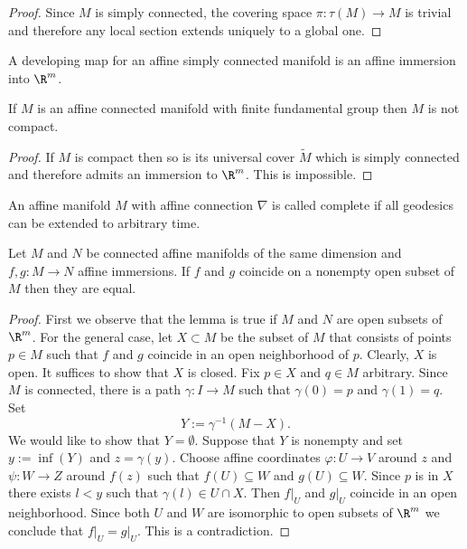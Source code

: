 \begin{proof}
	Since $M$ is simply connected, the covering space $\pi: \tau(M) \rightarrow M$ is trivial and therefore any local section extends uniquely to a global one.
\end{proof}

\begin{definition} 
	A developing map for an affine simply connected manifold is an affine immersion into $\R^m$.
\end{definition}

\begin{corollary}
	If $M$ is an affine connected manifold with finite fundamental group then $M$ is not compact.
\end{corollary}

\begin{proof}
	If $M$ is compact then so is its universal cover $\tilde{M}$ which is simply connected and therefore admits an immersion to $\R^m$. This is impossible.
\end{proof}

\begin{definition} 
	An affine manifold $M$ with affine connection $\nabla$ is called complete if all geodesics can be extended to arbitrary time.
\end{definition}

\begin{lemma}\label{unique}
	Let $M$ and $N$ be connected affine manifolds of the same dimension and $f,g:M \rightarrow N$ affine immersions. If $f$ and $g$ coincide on a nonempty open subset of $M$ then they are equal.
\end{lemma}
\begin{proof}
	First we observe that the lemma is true if $M$ and $N$ are open subsets of $\R^m$.
	For the general case, let $X\subset M$ be the subset of $M$ that consists of points $p\in M$ such that $f$ and $g$ coincide in an open neighborhood of $p$. Clearly, $X$ is open. It suffices to show that $X$ is closed.
	Fix $p \in X$ and $q \in M$ arbitrary. Since $M$ is connected, there is a path $\gamma: I \rightarrow M$ such that
	$\gamma(0)=p$ and $\gamma(1)=q$. Set \[Y:= \gamma^{-1}(M-X).\] We would like to show that $Y=\emptyset$. Suppose that $Y$ is nonempty and set $y:=\inf(Y)$ and $z=\gamma(y)$. Choose affine coordinates $\varphi: U \rightarrow V$ around $z$ and $ \psi: W \rightarrow Z $ around $f(z)$ such that $f(U) \subseteq W$ and $g(U) \subseteq W$. Since $p$ is in $X$ there exists $l<y$ such that $\gamma(l) \in U\cap X$. Then $f\vert_U$ and $g\vert_U$ coincide in an open neighborhood. Since both $U$ and $ W$ are isomorphic to open subsets of $\R^m$ we conclude that $f\vert_U=g\vert_U$. This is a contradiction.
\end{proof}


